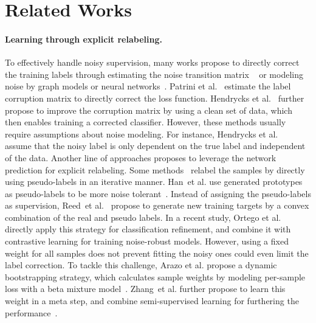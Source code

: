 \documentclass{article}
\begin{document}
\section{Related Works}
\paragraph{Learning through explicit relabeling.}
To effectively handle noisy supervision, many works propose to directly correct the training labels through estimating the noise transition matrix ~\cite{xia2019anchor,yao2020dual,goldberger2017training,patrini2017making} or modeling noise by graph models or neural networks~\cite{xiao2015learning,vahdat2017toward,veit2017learning,lee2018cleannet}.
Patrini et al.~\cite{patrini2017making} estimate the label corruption matrix to directly correct the loss function.
Hendrycks et al.~\cite{hendrycks2018using} further propose to improve the corruption matrix by using a clean set of data, which then enables training a corrected classifier. However, these methods usually require assumptions about noise modeling.
For instance, Hendrycks et al.~\cite{hendrycks2018using} assume that the noisy label is only dependent on the true label and
independent of the data.
Another line of approaches proposes to leverage the network prediction for explicit relabeling. 
Some methods~\cite{tanaka2018joint,yi2019probabilistic} relabel the samples by directly using pseudo-labels in an iterative manner.
Han~et al. use generated prototypes as pseudo-labels to be more noise tolerant~\cite{han2019deep}. 
Instead of assigning the pseudo-labels as supervision, Reed~et al.~\cite{reed2014training} propose to generate new training targets by a convex combination of the real and pseudo labels.
In a recent study, Ortego et al.~\cite{Ortego_2021_CVPR} directly apply this strategy for classification refinement, and combine it with contrastive learning for training noise-robust models.
However, using a fixed weight for all samples does not prevent fitting the noisy ones could even limit the label correction.
To tackle this challenge, Arazo et al. propose a dynamic bootstrapping strategy, which calculates sample weights
by modeling per-sample loss with a beta mixture model~\cite{arazo2019unsupervised}.
Zhang~et al. further propose to learn this weight in a meta step, and combine semi-supervised learning for furthering the performance~\cite{zhang2020distilling}.
\end{document}
